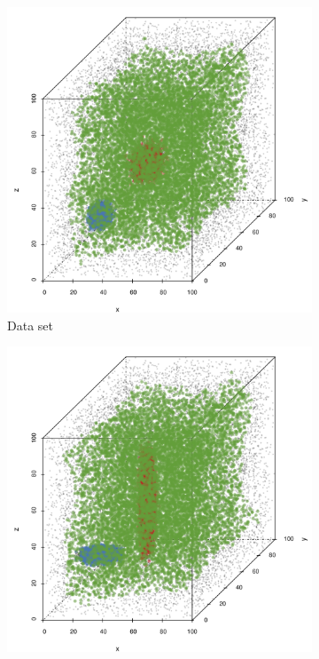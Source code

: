 		\begin{figure}
			\centering
			\begin{subfigure}{0.23\textwidth}
				\centering
				\includegraphics[keepaspectratio=true, width=\textwidth, height=0.23\textheight]{discussion/img/ferdosi_2_abs_error_mbeSmallerThansambe}
				\caption{Data set \ferdosiTwo}
				\label{fig:discussion:performance:mbeLowerError:ferdosi2}
			\end{subfigure}
			\begin{subfigure}{0.23\textwidth}
				\centering
				\includegraphics[keepaspectratio=true, width=\textwidth, height=0.23\textheight]{discussion/img/baakman_2_abs_error_mbeSmallerThansambe}

\end{subfigure}
\end{figure}
